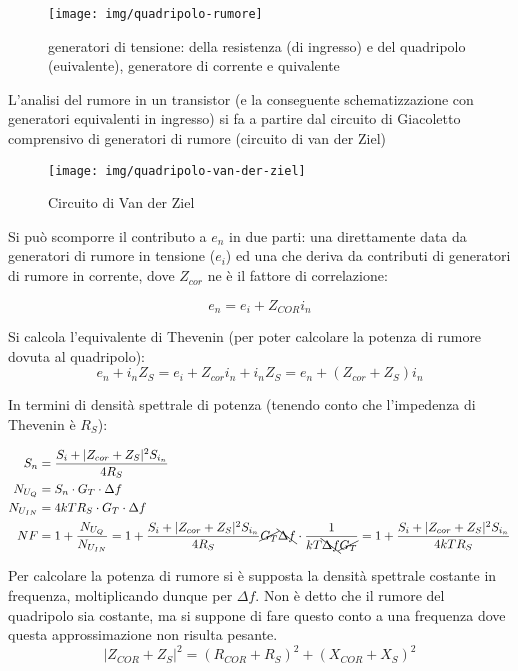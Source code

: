 \begin{figure}[hbt]
	\centering
	\texttt{[image: img/quadripolo-rumore]}
	\caption{generatori di tensione: della resistenza (di ingresso) e del quadripolo (euivalente), generatore di corrente e quivalente}
	\label{fig:rumorebruttissimo}
\end{figure}


L'analisi del rumore in un transistor (e la conseguente schematizzazione con generatori equivalenti in ingresso) si fa a partire dal circuito di Giacoletto comprensivo di generatori di rumore (circuito di van der Ziel)

%
%


\begin{figure}[hbt]
	\centering
	\texttt{[image: img/quadripolo-van-der-ziel]}
	\caption{Circuito di Van der Ziel
	}
	\label{fig:rumorebruttissimo1}
\end{figure}

Si può scomporre il contributo a $e_n$ in due parti: una direttamente data da generatori di rumore in tensione ($e_i$) ed una che deriva da contributi di generatori di rumore in corrente, dove $Z_{cor}$ ne è il fattore di correlazione:

\[
e_n = e_i + Z_{COR}i_n
\]

Si calcola l'equivalente di Thevenin (per poter calcolare la potenza di rumore dovuta al quadripolo):
\[e_n + i_nZ_S = e_i + Z_{cor}i_n + i_n Z_S =
e_n + (Z_{cor}+Z_S)i_n\]

In termini di densità spettrale di potenza (tenendo conto che l'impedenza di Thevenin è $R_S$):

\begin{align*}
S_{n} &= \frac{S_i + |Z_{cor} + Z_S|^2 S_{i_n}}{4R_S}\\
N_{U_Q} &= S_{n} \cdot G_T \cdot \Delta f\\
N_{U_{IN}} &= 4kT R_S \cdot G_T \cdot \Delta f\\
NF&=1+\frac{N_{U_Q}}{N_{U_{IN}}} =
1+ \frac{S_i + |Z_{cor} + Z_S|^2 S_{i_n}}{4R_S}\cancel{G_T} \bcancel{\Delta f} \cdot \frac{1}{kT \bcancel{\Delta f} \cancel{G_T}}=
1+\frac{S_i + |Z_{cor} + Z_S|^2 S_{i_n}}{4kT R_S}
\end{align*}

Per calcolare la potenza di rumore si è supposta la densità spettrale costante in frequenza, moltiplicando dunque per $\Delta f$. Non è detto che il rumore del quadripolo sia costante, ma si suppone di fare questo conto a una frequenza dove questa approssimazione non risulta pesante.
\[
|Z_{COR} + Z_S|^2 = (R_{COR} + R_S)^2 + (X_{COR} + X_S)^2
\]


